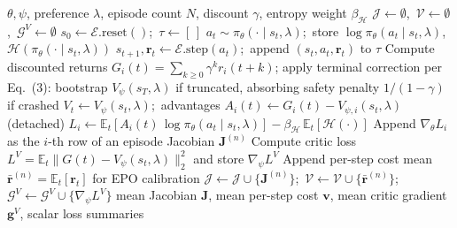 \documentclass[12pt, letterpaper]{article}
\begin{document}
\begin{algorithm}[!ht]
\caption{\textsc{CollectPref}: per-preference rollout and gradient extraction}
\label{alg:rollout}
\begin{algorithmic}[1]
\Require $\theta, \psi$, preference $\lambda$, episode count $N$, discount $\gamma$, entropy weight $\beta_{\mathcal{H}}$
\State $\mathcal{J} \gets \emptyset$,\ $\mathcal{V} \gets \emptyset$,\ $\mathcal{G}^{V} \gets \emptyset$
    \State $s_0 \gets \mathcal{E}.\text{reset}()$;\ $\tau \gets [\,]$
        \State $a_t \sim \pi_\theta(\cdot \mid s_t, \lambda)$;\ store $\log\pi_\theta(a_t\mid s_t,\lambda)$, $\mathcal{H}(\pi_\theta(\cdot\mid s_t,\lambda))$
        \State $s_{t+1}, \bm{r}_t \gets \mathcal{E}.\text{step}(a_t)$;\ append $(s_t, a_t, \bm{r}_t)$ to $\tau$
    \EndWhile
    \State Compute discounted returns $G_i(t) = \sum_{k\ge 0}\gamma^k r_i(t{+}k)$; apply terminal correction per Eq.~(3): bootstrap $V_\psi(s_T,\lambda)$ if truncated, absorbing safety penalty $1/(1{-}\gamma)$ if crashed
    \State $V_t \gets V_\psi(s_t, \lambda)$;\ advantages $A_i(t) \gets G_i(t) - V_{\psi,i}(s_t, \lambda)$ (detached)
     
        \State $L_i \gets \mathbb{E}_t[A_i(t)\,\log \pi_\theta(a_t\mid s_t,\lambda)] - \beta_{\mathcal{H}}\,\mathbb{E}_t[\mathcal{H}(\cdot)]$
        \State Append $\nabla_\theta L_i$ as the $i$-th row of an episode Jacobian $\bm{J}^{(n)}$
    \EndFor
    \State Compute critic loss $L^{V} = \mathbb{E}_t \|G(t) - V_\psi(s_t,\lambda)\|_2^2$ and store $\nabla_\psi L^{V}$
    \State Append per-step cost mean $\bar{\bm{r}}^{(n)} = \mathbb{E}_t[\bm{r}_t]$ for EPO calibration
    \State $\mathcal{J} \gets \mathcal{J} \cup \{\bm{J}^{(n)}\}$;\ $\mathcal{V} \gets \mathcal{V} \cup \{\bar{\bm{r}}^{(n)}\}$;\ $\mathcal{G}^{V} \gets \mathcal{G}^{V} \cup \{\nabla_\psi L^{V}\}$
\EndFor
\State \Return mean Jacobian $\bm{J}$, mean per-step cost $\bm{v}$, mean critic gradient $\bm{g}^{V}$, scalar loss summaries
\end{algorithmic}
\end{algorithm}
\end{document}
